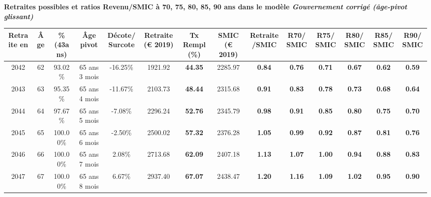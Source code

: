  \vspace{0.1cm} 
{\bf \noindent Retraites possibles et ratios Revenu/SMIC à 70, 75, 80, 85, 90 ans dans le modèle \emph{Gouvernement corrigé (âge-pivot glissant)}}  
 
\begin{adjustbox}{max width=\textwidth} 
\begin{tabular}[htb]{|c|c||c|c|c||c|c||c|c||c|c|c|c|c|} 
\hline 
 Retraite en &  Âge &  \%(43ans) &  Âge pivot &  Décote/Surcote &  Retraite (\euro{} 2019) &  Tx Rempl(\%) &  SMIC (\euro{} 2019) &  Retraite/SMIC &  R70/SMIC &  R75/SMIC &  R80/SMIC &  R85/SMIC &  R90/SMIC \\ 
\hline \hline 
 2042 &  62 &  93.02\% &  65 ans 3 mois &  -16.25\% &  1921.92 &  {\bf 44.35} &  2285.97 &  {\bf {\color{red} 0.84}} &  {\bf {\color{red} 0.76}} &  {\bf {\color{red} 0.71}} &  {\bf {\color{red} 0.67}} &  {\bf {\color{red} 0.62}} &  {\bf {\color{red} 0.59}} \\ 
\hline 
 2043 &  63 &  95.35\% &  65 ans 4 mois &  -11.67\% &  2103.73 &  {\bf 48.44} &  2315.68 &  {\bf {\color{red} 0.91}} &  {\bf {\color{red} 0.83}} &  {\bf {\color{red} 0.78}} &  {\bf {\color{red} 0.73}} &  {\bf {\color{red} 0.68}} &  {\bf {\color{red} 0.64}} \\ 
\hline 
 2044 &  64 &  97.67\% &  65 ans 5 mois &  -7.08\% &  2296.24 &  {\bf 52.76} &  2345.79 &  {\bf {\color{red} 0.98}} &  {\bf {\color{red} 0.91}} &  {\bf {\color{red} 0.85}} &  {\bf {\color{red} 0.80}} &  {\bf {\color{red} 0.75}} &  {\bf {\color{red} 0.70}} \\ 
\hline 
 2045 &  65 &  100.00\% &  65 ans 6 mois &  -2.50\% &  2500.02 &  {\bf 57.32} &  2376.28 &  {\bf 1.05} &  {\bf {\color{red} 0.99}} &  {\bf {\color{red} 0.92}} &  {\bf {\color{red} 0.87}} &  {\bf {\color{red} 0.81}} &  {\bf {\color{red} 0.76}} \\ 
\hline 
 2046 &  66 &  100.00\% &  65 ans 7 mois &  2.08\% &  2713.68 &  {\bf 62.09} &  2407.18 &  {\bf 1.13} &  {\bf 1.07} &  {\bf 1.00} &  {\bf {\color{red} 0.94}} &  {\bf {\color{red} 0.88}} &  {\bf {\color{red} 0.83}} \\ 
\hline 
 2047 &  67 &  100.00\% &  65 ans 8 mois &  6.67\% &  2937.40 &  {\bf 67.07} &  2438.47 &  {\bf 1.20} &  {\bf 1.16} &  {\bf 1.09} &  {\bf 1.02} &  {\bf {\color{red} 0.95}} &  {\bf {\color{red} 0.90}} \\ 
\hline 
\hline 
\end{tabular} 
\end{adjustbox} 
 
